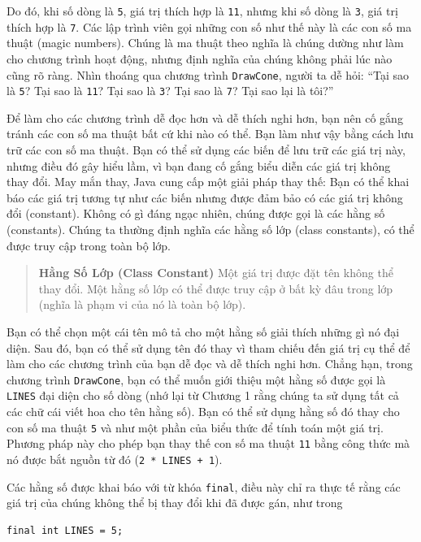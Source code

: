 Do đó, khi số dòng là \texttt{5}, giá trị thích hợp là \texttt{11},
nhưng khi số dòng là \texttt{3}, giá trị thích hợp là \texttt{7}. Các
lập trình viên gọi những con số như thế này là các con số ma thuật
(magic numbers). Chúng là ma thuật theo nghĩa là chúng dường như làm cho
chương trình hoạt động, nhưng định nghĩa của chúng không phải lúc nào
cũng rõ ràng. Nhìn thoáng qua chương trình \texttt{DrawCone}, người ta
dễ hỏi: ``Tại sao là \texttt{5}? Tại sao là \texttt{11}? Tại sao là
\texttt{3}? Tại sao là \texttt{7}? Tại sao lại là tôi?''

Để làm cho các chương trình dễ đọc hơn và dễ thích nghi hơn, bạn nên cố
gắng tránh các con số ma thuật bất cứ khi nào có thể. Bạn làm như vậy
bằng cách lưu trữ các con số ma thuật. Bạn có thể sử dụng các biến để
lưu trữ các giá trị này, nhưng điều đó gây hiểu lầm, vì bạn đang cố gắng
biểu diễn các giá trị không thay đổi. May mắn thay, Java cung cấp một
giải pháp thay thế: Bạn có thể khai báo các giá trị tương tự như các
biến nhưng được đảm bảo có các giá trị không đổi (constant). Không có gì
đáng ngạc nhiên, chúng được gọi là các hằng số (constants). Chúng ta
thường định nghĩa các hằng số lớp (class constants), có thể được truy
cập trong toàn bộ lớp.

\begin{quote}
\textbf{Hằng Số Lớp (Class Constant)} Một giá trị được đặt tên không thể
thay đổi. Một hằng số lớp có thể được truy cập ở bất kỳ đâu trong lớp
(nghĩa là phạm vi của nó là toàn bộ lớp).
\end{quote}

Bạn có thể chọn một cái tên mô tả cho một hằng số giải thích những gì nó
đại diện. Sau đó, bạn có thể sử dụng tên đó thay vì tham chiếu đến giá
trị cụ thể để làm cho các chương trình của bạn dễ đọc và dễ thích nghi
hơn. Chẳng hạn, trong chương trình \texttt{DrawCone}, bạn có thể muốn
giới thiệu một hằng số được gọi là \texttt{LINES} đại diện cho số dòng
(nhớ lại từ Chương 1 rằng chúng ta sử dụng tất cả các chữ cái viết hoa
cho tên hằng số). Bạn có thể sử dụng hằng số đó thay cho con số ma thuật
\texttt{5} và như một phần của biểu thức để tính toán một giá trị.
Phương pháp này cho phép bạn thay thế con số ma thuật \texttt{11} bằng
công thức mà nó được bắt nguồn từ đó (\texttt{2\ *\ LINES\ +\ 1}).

Các hằng số được khai báo với từ khóa \texttt{final}, điều này chỉ ra
thực tế rằng các giá trị của chúng không thể bị thay đổi khi đã được
gán, như trong

\begin{verbatim}
final int LINES = 5;
\end{verbatim}

